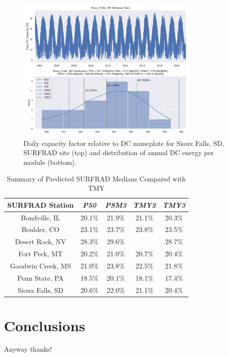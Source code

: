 \documentclass[conference]{IEEEtran}
\begin{document}
\begin{figure}[htbp]
\centerline{\includegraphics[width=9cm]{Sioux_Falls_SD.png}}
\caption{Daily capacity factor relative to DC nameplate for Sioux Falls, SD, SURFRAD site (top) and distribution of annual DC energy per module (bottom).}
\label{fig:Sioux-Falls-SD}
\end{figure}

\begin{table}[htbp]
\caption{Summary of Predicted SURFRAD Medians Compared with TMY}
\begin{center}
\begin{tabular}{|c|c|c|c|c|}
\hline
\textbf{SURFRAD Station} & \textbf{\textit{P50}}& \textbf{\textit{PSM3}}& \textbf{\textit{TMY2}}& \textbf{\textit{TMY3}} \\
\hline
Bondville, IL    & 20.1\%& 21.9\%& 21.1\%& 20.3\% \\
Boulder, CO      & 23.1\%& 23.7\%& 23.8\%& 23.5\% \\
Desert Rock, NV  & 28.3\%& 29.6\%&       & 28.7\% \\
Fort Peck, MT    & 20.2\%& 21.0\%& 20.7\%& 20.4\% \\
Goodwin Creek, MS& 21.0\%& 23.8\%& 22.5\%& 21.8\% \\
Penn State, PA   & 18.5\%& 20.1\%& 18.1\%& 17.4\% \\
Sioux Falls, SD  & 20.6\%& 22.0\%& 21.1\%& 20.4\% \\
\hline
\end{tabular}
\label{table:surfrad-tmy-summary}
\end{center}
\end{table}

\section{Conclusions}
Anyway thanks!



\end{document}
